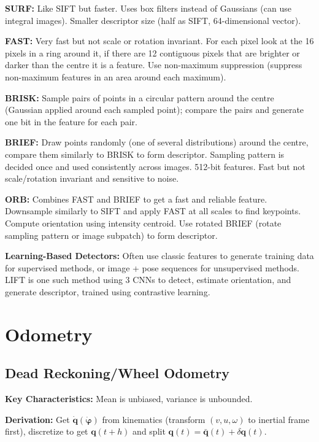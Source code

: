 \documentclass[twocolumn, 8pt]{extarticle}
\begin{document}
\textbf{SURF:} Like SIFT but faster. Uses box filters instead of Gaussians (can use integral images). Smaller descriptor
size (half as SIFT, 64-dimensional vector).

\textbf{FAST:} Very fast but not scale or rotation invariant. For each pixel look at the 16 pixels in a ring around it,
if there are 12 contiguous pixels that are brighter or darker than the centre it is a feature. Use non-maximum
suppression (suppress non-maximum features in an area around each maximum).

\textbf{BRISK:} Sample pairs of points in a circular pattern around the centre (Gaussian applied around each sampled
point); compare the pairs and generate one bit in the feature for each pair.

\textbf{BRIEF:} Draw points randomly (one of several distributions) around the centre, compare them similarly to BRISK
to form descriptor. Sampling pattern is decided once and used consistently across images. 512-bit features. Fast but not
scale/rotation invariant and sensitive to noise.

\textbf{ORB:} Combines FAST and BRIEF to get a fast and reliable feature. Downsample similarly to SIFT and apply FAST at
all scales to find keypoints. Compute orientation using intensity centroid. Use rotated BRIEF (rotate sampling pattern
or image subpatch) to form descriptor.

\textbf{Learning-Based Detectors:} Often use classic features to generate training data for supervised methods, or image
+ pose sequences for unsupervised methods. LIFT is one such method using 3 CNNs to detect, estimate orientation, and
generate descriptor, trained using contrastive learning.

\section{Odometry} %

\subsection{Dead Reckoning/Wheel Odometry}

\textbf{Key Characteristics:} Mean is unbiased, variance is unbounded.

\textbf{Derivation:} Get \(\dot{\bm q}(\dot{\bm\varphi})\) from kinematics (transform \((v, u, \omega)\) to inertial
frame first), discretize to get \(\bm q(t + h)\) and split \(\bm q(t) = \bar{\bm q}(t) + \delta\bm q(t)\).
\end{document}
